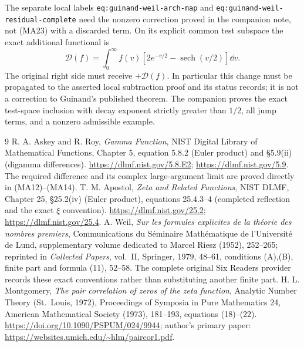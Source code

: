 \documentclass[11pt]{article}
\begin{document}
The separate local labels \texttt{eq:guinand-weil-arch-map} and
\texttt{eq:guinand-weil-residual-complete} need the nonzero correction proved
in the companion note, not (MA23) with a discarded term. On its explicit
common test subspace the exact additional functional is
\[
 \mathcal D(f)=\int_0^\infty f(v)
       [2e^{-v/2}-\operatorname{sech}(v/2)]\dd v.
\]
The original right side must receive $+\mathcal D(f)$. In particular this
change must be propagated to the asserted local subtraction proof and its
status records; it is not a correction to Guinand's published theorem.
The companion proves the exact test-space inclusion with decay exponent
strictly greater than $1/2$, all jump terms, and a nonzero admissible example.

\begin{thebibliography}{9}
 R. A. Askey and R. Roy, \emph{Gamma Function}, NIST Digital
Library of Mathematical Functions, Chapter 5, equation 5.8.2 (Euler product)
and \S5.9(ii) (digamma differences).
\url{https://dlmf.nist.gov/5.8.E2}; \url{https://dlmf.nist.gov/5.9}.
The required difference and its complex large-argument limit are proved
directly in (MA12)--(MA14).
 T. M. Apostol, \emph{Zeta and Related Functions}, NIST DLMF,
Chapter 25, \S25.2(iv) (Euler product), equations 25.4.3--4 (completed
reflection and the exact $\xi$ convention).
\url{https://dlmf.nist.gov/25.2}; \url{https://dlmf.nist.gov/25.4}.
 A. Weil, \emph{Sur les formules explicites de la th\'eorie
des nombres premiers}, Communications du S\'eminaire Math\'ematique de
l'Universit\'e de Lund, supplementary volume dedicated to Marcel Riesz
(1952), 252--265; reprinted in \emph{Collected Papers}, vol.~II,
Springer, 1979, 48--61, conditions (A),(B), finite part and formula (11),
52--58. The complete original Six Readers provider records these exact
conventions rather than substituting another finite part.
 H. L. Montgomery, \emph{The pair correlation of zeros
of the zeta function}, Analytic Number Theory (St.~Louis, 1972),
Proceedings of Symposia in Pure Mathematics 24, American Mathematical
Society (1973), 181--193, equations (18)--(22).
\url{https://doi.org/10.1090/PSPUM/024/9944}; author's primary paper:
\url{https://websites.umich.edu/~hlm/paircor1.pdf}.
\end{thebibliography}
\end{document}

